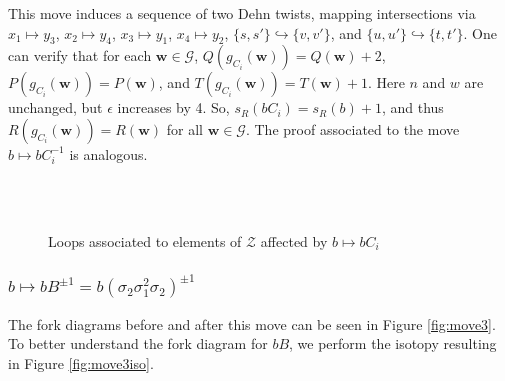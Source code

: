 \documentclass[11pt]{article}
\theoremstyle{plain} \newtheorem{thm}{Theorem}[subsection]
\theoremstyle{plain} \newtheorem{cor}[thm]{Corollary}
\theoremstyle{plain} \newtheorem{prop}[thm]{Proposition}
\theoremstyle{plain} \newtheorem{conj}[thm]{Conjecture}
\theoremstyle{plain} \newtheorem{lem}[thm]{Lemma}
\theoremstyle{definition} \newtheorem{df}[thm]{Definition}
\theoremstyle{remark} \newtheorem{rmk}[thm]{Remark}
\theoremstyle{remark} \newtheorem{obs}[thm]{Observation}
\newcommand{\Zcal}{\mathcal{Z}}
\newcommand{\G}{\mathcal{G}}
\newcommand{\bw}{\mathbf{w}}
\begin{document}
This move induces a sequence of two Dehn twists, mapping intersections via $x_{1} \mapsto y_{3}$, $x_{2} \mapsto y_{4}$, $x_{3} \mapsto y_{1}$, $x_{4} \mapsto y_{2}$, $\{ s, s' \} \hookrightarrow \{ v, v'\}$, and $\{ u, u' \} \hookrightarrow \{ t, t'\}$.  One can verify that for each $\bw \in \G$, $Q(g_{C_{i}}(\bw)) = Q(\bw) + 2$, $P(g_{C_{i}}(\bw)) =  P(\bw)$, and $T(g_{C_{i}}(\bw)) = T(\bw) + 1$.  Here $n$ and $w$ are unchanged, but $\epsilon$ increases by 4.  So, $s_{R}(b C_{i}) = s_{R}(b) + 1$, and thus $R(g_{C_{i}}(\bw)) = R(\bw)$ for all $\bw \in \G$.  The proof associated to the move $b \mapsto b C_{i}^{-1}$ is analogous.

\begin{figure}[h!]
\centering
{}\quad
{}\quad
{}\quad
{}\\
\quad
{}\quad
{}\quad
{}\\
\quad
{}\quad
{}\quad
{}
\caption[Loops associated to $b \mapsto b C_{i}$]{Loops associated to elements of $\Zcal$ affected by $b \mapsto b C_{i}$\label{fig:move2loops}}
\end{figure}

\subsubsection{$b \mapsto bB^{\pm 1} = b\left(\sigma_{2}\sigma_{1}^{2}\sigma_{2}\right)^{\pm1}$}\label{subsec:move3}

The fork diagrams before and after this move can be seen in Figure \ref{fig:move3}.  To better understand the fork diagram for $b B$, we perform the isotopy resulting in Figure \ref{fig:move3iso}.
\end{document}
